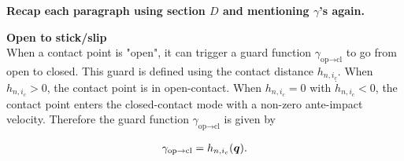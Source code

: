 \documentclass[../DC2017114Bouma.tex]{subfiles}
\begin{document}
\textbf{Recap each paragraph using section $D$ and mentioning $\gamma$'s again.}

\textbf{Open to stick/slip}\\
When a contact point is "open", it can trigger a guard function $\gamma_{\text{op}\rightarrow\text{cl}}$ to go from open to closed. This guard is defined using the contact distance $h_{n,i_c}$. When $h_{n,i_c}>0$, the contact point is in open-contact. When $h_{n,i_c}=0$ with $\dot{h}_{n,i_c}<0$, the contact point enters the closed-contact mode with a non-zero ante-impact velocity. Therefore the guard function $\gamma_{\text{op}\rightarrow\text{cl}}$ is given by

\begin{align}
\gamma_{\text{op}\rightarrow\text{cl}} = h_{n,i_c}({\boldsymbol{q}}).
\end{align}
\end{document}
